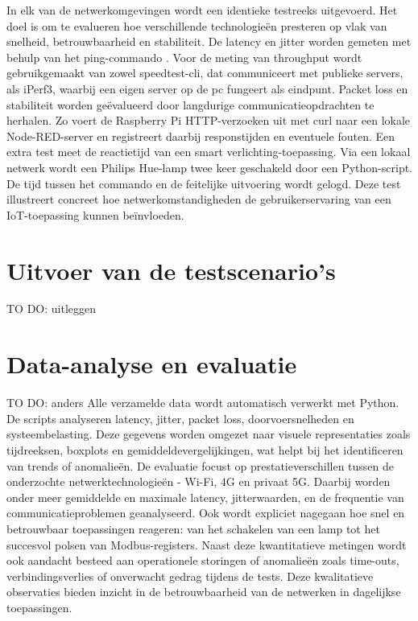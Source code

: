 In elk van de netwerkomgevingen wordt een identieke testreeks uitgevoerd. Het doel is om te evalueren hoe verschillende technologieën presteren op vlak van snelheid, betrouwbaarheid en stabiliteit.
De latency en jitter worden gemeten met behulp van het ping-commando . Voor de meting van throughput wordt gebruikgemaakt van zowel speedtest-cli, dat communiceert met publieke servers, als iPerf3, waarbij een eigen server op de pc fungeert als eindpunt.
Packet loss en stabiliteit worden geëvalueerd door langdurige communicatieopdrachten te herhalen. Zo voert de Raspberry Pi HTTP-verzoeken uit met curl naar een lokale Node-RED-server en registreert daarbij responstijden en eventuele fouten. 
Een extra test meet de reactietijd van een smart verlichting-toepassing. Via een lokaal netwerk wordt een Philips Hue-lamp twee keer geschakeld door een Python-script. De tijd tussen het commando en de feitelijke uitvoering wordt gelogd. Deze test illustreert concreet hoe netwerkomstandigheden de gebruikerservaring van een IoT-toepassing kunnen beïnvloeden.


\section{Uitvoer van de testscenario’s}

TO DO: uitleggen


\section{Data-analyse en evaluatie}

TO DO: anders
Alle verzamelde data wordt automatisch verwerkt met Python. De scripts analyseren latency, jitter, packet loss, doorvoersnelheden en systeembelasting. Deze gegevens worden omgezet naar visuele representaties zoals tijdreeksen, boxplots en gemiddeldevergelijkingen, wat helpt bij het identificeren van trends of anomalieën.
De evaluatie focust op prestatieverschillen tussen de onderzochte netwerktechnologieën - Wi-Fi, 4G en privaat 5G. Daarbij worden onder meer gemiddelde en maximale latency, jitterwaarden, en de frequentie van communicatieproblemen geanalyseerd. Ook wordt expliciet nagegaan hoe snel en betrouwbaar toepassingen reageren: van het schakelen van een lamp tot het succesvol polsen van Modbus-registers.
Naast deze kwantitatieve metingen wordt ook aandacht besteed aan operationele storingen of anomalieën zoals time-outs, verbindingsverlies of onverwacht gedrag tijdens de tests. Deze kwalitatieve observaties bieden inzicht in de betrouwbaarheid van de netwerken in dagelijkse toepassingen.







